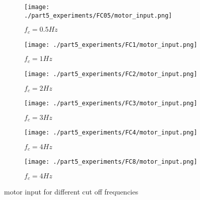 \begin{figure}[H]
	\centering
	\begin{subfigure}[b]{0.45\textwidth}
		\texttt{[image: ./part5\_experiments/FC05/motor\_input.png]}
		\caption{$f_c=0.5Hz$}
	\end{subfigure}
	\begin{subfigure}[b]{0.45\textwidth}
		\texttt{[image: ./part5\_experiments/FC1/motor\_input.png]}
		\caption{$f_c=1Hz$}
	\end{subfigure}
	\begin{subfigure}[b]{0.45\textwidth}
		\texttt{[image: ./part5\_experiments/FC2/motor\_input.png]}
		\caption{$f_c=2Hz$}
	\end{subfigure}
	\begin{subfigure}[b]{0.45\textwidth}
		\texttt{[image: ./part5\_experiments/FC3/motor\_input.png]}
		\caption{$f_c=3Hz$}
	\end{subfigure}
	\begin{subfigure}[b]{0.45\textwidth}
		\texttt{[image: ./part5\_experiments/FC4/motor\_input.png]}
		\caption{$f_c=4Hz$}
	\end{subfigure}
	\begin{subfigure}[b]{0.45\textwidth}
		\texttt{[image: ./part5\_experiments/FC8/motor\_input.png]}
		\caption{$f_c=4Hz$}
	\end{subfigure}
	\caption{motor input for different cut off frequencies}
\end{figure}

